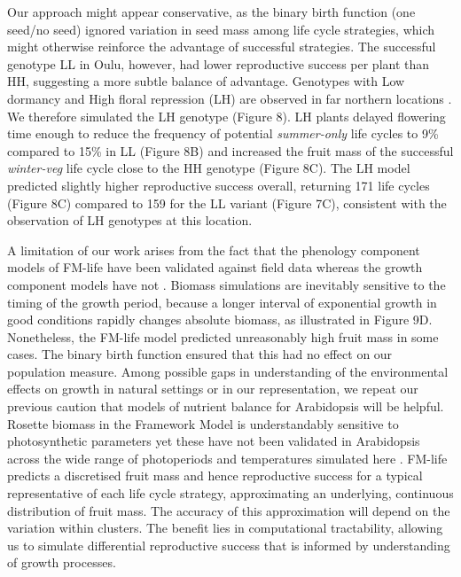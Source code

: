 \documentclass[phd]{infthesis}
\begin{document}
Our approach might appear conservative, as the binary birth function (one
seed/no seed) ignored variation in seed mass among life cycle strategies, which
might otherwise reinforce the advantage of successful strategies. The successful
genotype LL in Oulu, however, had lower reproductive success per plant than HH,
suggesting a more subtle balance of advantage. Genotypes with Low dormancy and
High floral repression (LH) are observed in far northern locations
\citep{atwell_genome-wide_2010}. We therefore simulated the LH genotype (Figure
8). LH plants delayed flowering time enough to reduce the frequency of potential
\emph{summer-only} life cycles to 9\% compared to 15\% in LL (Figure 8B) and
increased the fruit mass of the successful \emph{winter-veg} life cycle close to
the HH genotype (Figure 8C). The LH model predicted slightly higher reproductive
success overall, returning 171 life cycles (Figure 8C) compared to 159 for the
LL variant (Figure 7C), consistent with the observation of LH genotypes at this
location.

A limitation of our work arises from the fact that the phenology component
models of FM-life have been validated against field data
\citep{wilczek_effects_2009,burghardt_modeling_2015} whereas the growth
component models have not
\citep{rasse_leaf_2006,christophe_model-based_2008}. Biomass simulations are
inevitably sensitive to the timing of the growth period, because a longer
interval of exponential growth in good conditions rapidly changes absolute
biomass, as illustrated in Figure 9D. Nonetheless, the FM-life model predicted
unreasonably high fruit mass in some cases. The binary birth function ensured
that this had no effect on our population measure. Among possible gaps in
understanding of the environmental effects on growth in natural settings or in
our representation, we repeat our previous caution \citep{chew_multiscale_2014,
  chew_linking_2017} that models of nutrient balance for Arabidopsis will be
helpful. Rosette biomass in the Framework Model is understandably sensitive to
photosynthetic parameters \citep{chew_multiscale_2014} yet these have not been
validated in Arabidopsis across the wide range of photoperiods and temperatures
simulated here \citep{walker_temperature_2013}. FM-life predicts a discretised
fruit mass and hence reproductive success for a typical representative of each
life cycle strategy, approximating an underlying, continuous distribution of
fruit mass. The accuracy of this approximation will depend on the variation
within clusters. The benefit lies in computational tractability, allowing us to
simulate differential reproductive success that is informed by understanding of
growth processes.
\end{document}
